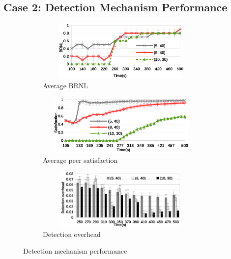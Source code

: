 % 
% 
% 
% 
% 

\subsection{Case 2: Detection Mechanism Performance}

\begin{figure}[tb]
  \centering
  \begin{subfigure}[c]{0.95\columnwidth}
    \centering
    \includegraphics[width=8.4cm,height=3cm]{./Figures/det-BRNL1.eps}
    \caption{Average BRNL}%
   \label{subfig:BRNL}
  \end{subfigure}
  \begin{subfigure}[c]{0.95\columnwidth}
    \centering
    \includegraphics[width=8.4cm,height=3cm]{./Figures/det-sat.eps}
    \caption{Average peer satisfaction}%
     \label{subfig:det-sat}
  \end{subfigure}
  \begin{subfigure}[c]{0.95\columnwidth}
    \centering
    \includegraphics[width=8.4cm,height=3cm]{./Figures/overhead.eps}
    \caption{Detection overhead}%
    \label{subfig:overhead}
  \end{subfigure}
  \caption{Detection mechanism performance}%
 \label{fig:detection-results}
  \vspace{-4mm}
\end{figure}

